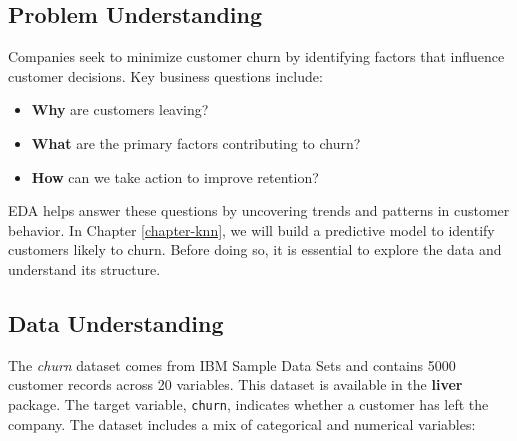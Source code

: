 \documentclass[
  11pt,
]{book}
\newcommand{\passthrough}[1]{#1}
\providecommand{\tightlist}{%
  \setlength{\itemsep}{0pt}\setlength{\parskip}{0pt}}
\theoremstyle{definition}
\theoremstyle{definition}
\theoremstyle{definition}
\theoremstyle{definition}
\theoremstyle{remark}
\begin{document}
\subsection*{Problem Understanding}\label{problem-understanding-1}


Companies seek to minimize customer churn by identifying factors that influence customer decisions. Key business questions include:

\begin{itemize}
\tightlist
\item
  \textbf{Why} are customers leaving?\\
\item
  \textbf{What} are the primary factors contributing to churn?\\
\item
  \textbf{How} can we take action to improve retention?
\end{itemize}

EDA helps answer these questions by uncovering trends and patterns in customer behavior. In Chapter \ref{chapter-knn}, we will build a predictive model to identify customers likely to churn. Before doing so, it is essential to explore the data and understand its structure.

\subsection*{Data Understanding}\label{data-understanding}


The \emph{churn} dataset comes from IBM Sample Data Sets and contains 5000 customer records across 20 variables. This dataset is available in the \textbf{liver} package. The target variable, \passthrough{\lstinline!churn!}, indicates whether a customer has left the company. The dataset includes a mix of categorical and numerical variables:
\end{document}
